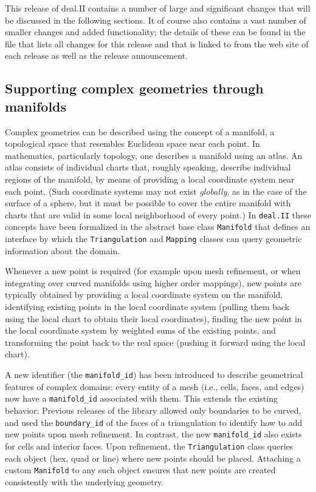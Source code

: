 \documentclass{ansarticle}
\newcommand{\specialword}[1]{\texttt{#1}}
\newcommand{\dealii}{{\specialword{deal.II}}}
\begin{document}
This release of deal.II contains a number of large and significant changes
that will be discussed in the following sections. It of course also contains a
vast number of smaller changes and added functionality; the details of these
can be found in the file that lists all changes for this release and that is
linked to from the web site of each release as well as the release
announcement.


\subsection{Supporting complex geometries through manifolds}

Complex geometries can be described using the concept of a manifold, a
topological space that resembles Euclidean space near each point. In
mathematics, particularly topology, one describes a manifold using an
atlas. An atlas consists of individual charts that, roughly speaking,
describe individual regions of the manifold, by means of providing a
local coordinate system near each point. (Such coordinate systems may not
exist \textit{globally}, as in the case of the surface of a sphere, but it
must be possible to cover the entire manifold with charts that are valid in
some local neighborhood of every point.) In \dealii{} these concepts
have been formalized in the abstract base class \verb|Manifold| that
defines an interface by which the \verb|Triangulation| and
\verb|Mapping| classes can query geometric information about the
domain.

Whenever a new point is required (for example upon mesh refinement, or
when integrating over curved manifolds using higher order mappings), new points are typically
obtained by providing a local coordinate system on the manifold,
identifying existing points in the local coordinate system (pulling
them back using the local chart to obtain their local coordinates),
finding the new point in the local coordinate system by weighted sums of
the existing points, and transforming the point back to the real space
(pushing it forward using the local chart).

A new identifier (the \verb|manifold_id|) has been introduced to
describe geometrical features of complex domains: every entity of a mesh
(i.e., cells, faces, and edges) now have a \verb|manifold_id| associated with
them. This extends the existing behavior: Previous releases of
the library allowed only boundaries to be curved, and used the
\verb|boundary_id| of the faces of a triangulation to identify how to
add new points upon mesh refinement.  In contrast, the new \verb|manifold_id|
also exists for cells and interior faces. Upon refinement, the
\verb|Triangulation| class queries each object (hex, quad or line)
where new points should be placed. Attaching a custom \verb|Manifold|
to any such object ensures that new points are created consistently
with the underlying geometry.
\end{document}
